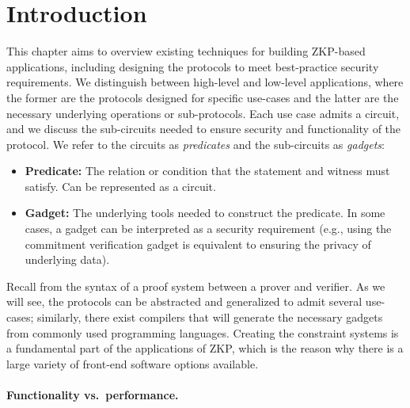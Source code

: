 \section{Introduction}  %
\label{apps:intro}
 
This chapter aims to overview existing techniques for building ZKP-based applications, including designing the protocols to meet best-practice security requirements.
We distinguish between high-level and low-level applications, where the former are the protocols designed for specific use-cases and the latter are the necessary underlying operations or sub-protocols.
Each use case admits a circuit, and we discuss the sub-circuits needed to ensure security and functionality of the protocol.
We refer to the circuits as \emph{predicates} and the sub-circuits as \emph{gadgets}:
\begin{itemize}

\item {\bfseries \hypertarget{def:predicate}{Predicate}:} 
The relation or condition that the statement and witness must satisfy.
Can be represented as a circuit.

\item \textbf{\hypertarget{def:gadget}{Gadget}:} 
The underlying tools needed to construct the predicate.  
In some cases, a gadget can be interpreted as a security requirement 
(e.g., using the commitment verification gadget is equivalent to ensuring the privacy of underlying data).
\loosen

\end{itemize}


	Recall from 
the syntax of a proof system between a prover and verifier.
	As we will see, the protocols can be abstracted and generalized to admit several use-cases; 
similarly, there exist compilers that will generate the necessary gadgets from commonly used programming languages. 
	Creating the constraint systems is a fundamental part of the applications of ZKP, which is the reason why there is a large variety of front-end software options available.






\paragraph{Functionality vs.\ performance.}

